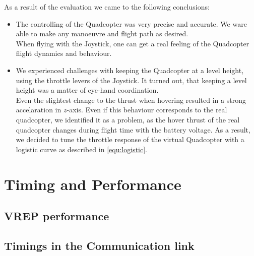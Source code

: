 As a result of the evaluation we came to the following conclusions:

\begin{itemize}
\item{The controlling of the Quadcopter was very precise and accurate. 
We ware able to make any manoeuvre and flight path as desired. \\ 

When flying with the Joystick, one can get a real feeling of the Quadcopter flight dynamics and behaviour}.

\item{We experienced challenges with keeping the Quadcopter at a level height, using the throttle levers of the Joystick. 
It turned out, that keeping a level height was a matter of eye-hand coordination. \\

Even the slightest change to the thrust when hovering resulted in a strong accelaration in $z$-axis. 
Even if this behaviour corresponds to the real quadcopter, we identified it as a problem, as the hover thrust of the real quadcopter changes during flight time with the battery voltage. 
As a result, we decided to tune the throttle response of the virtual Quadcopter with a logistic curve as described in \ref{equ:logistic}}.

\end{itemize}

\section{Timing and Performance}
\subsection{VREP performance}
\subsection{Timings in the Communication link}
\label{sec:commTiming}



